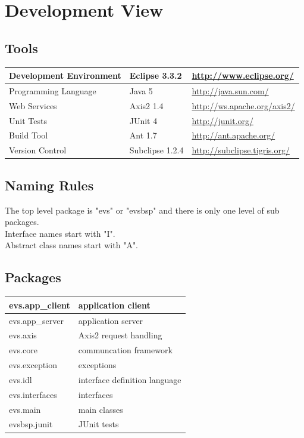 \documentclass[a4paper]{article}
\begin{document}
\section{Development View}

\subsection{Tools}

	\begin{tabular}{|l|l|l|}
	\hline
	Development Environment & Eclipse 3.3.2 & \url{http://www.eclipse.org/}\\
	\hline
	Programming Language & Java 5 & \url{http://java.sun.com/}\\
	\hline
	Web Services & Axis2 1.4 & \url{http://ws.apache.org/axis2/}\\
	\hline
	Unit Tests & JUnit 4 & \url{http://junit.org/}\\
	\hline
	Build Tool & Ant 1.7 & \url{http://ant.apache.org/}\\
	\hline
	Version Control & Subclipse 1.2.4 & \url{http://subclipse.tigris.org/}\\
	\hline
	\end{tabular}

\subsection{Naming Rules}

The top level package is "evs" or "evsbsp" and there is only one level of sub packages.\\
Interface names start with "I".\\
Abstract class names start with "A".\\

\subsection{Packages}

	\begin{tabular}{|l|l|}
	\hline
	evs.app\_client & application client\\
	\hline
	evs.app\_server & application server\\
	\hline
	evs.axis & Axis2 request handling\\
	\hline
	evs.core & communcation framework\\
	\hline
	evs.exception & exceptions\\
	\hline
	evs.idl & interface definition language\\
	\hline
	evs.interfaces & interfaces\\
	\hline
	evs.main & main classes\\
	\hline
	evsbsp.junit & JUnit tests\\
	\hline
	\end{tabular}
\end{document}
